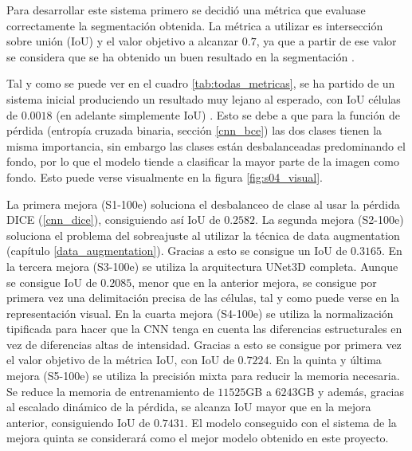 
Para desarrollar este sistema primero se decidió una métrica que evaluase correctamente la segmentación obtenida. La métrica a utilizar es intersección sobre unión (IoU) y el valor objetivo a alcanzar $0.7$, ya que a partir de ese valor se considera que se ha obtenido un buen resultado en la segmentación \cite{Falk2019}.

Tal y como se puede ver en el cuadro \ref{tab:todas_metricas}, se ha partido de un sistema inicial produciendo un resultado muy lejano al esperado, con IoU células de $0.0018$ (en adelante simplemente IoU) . Esto se debe a que para la función de pérdida (entropía cruzada binaria, sección \ref{cnn_bce}) las dos clases tienen la misma importancia, sin embargo las clases están desbalanceadas predominando el fondo, por lo que el modelo tiende a clasificar la mayor parte de la imagen como fondo. Esto puede verse visualmente en la figura \ref{fig:s04_visual}.

La primera mejora (S1-100e) soluciona el desbalanceo de clase al usar la pérdida DICE (\ref{cnn_dice}), consiguiendo así IoU de $0.2582$. La segunda mejora (S2-100e) soluciona el problema del sobreajuste  al utilizar la técnica de data augmentation (capítulo \ref{data_augmentation}). Gracias a esto se consigue un IoU de $0.3165$. En la tercera mejora (S3-100e) se utiliza la arquitectura UNet3D completa. Aunque se consigue IoU de $0.2085$, menor que en la anterior mejora, se consigue por primera vez una delimitación precisa de las células, tal y como puede verse en la representación visual. En la cuarta mejora (S4-100e) se utiliza la normalización tipificada para hacer que la CNN tenga en cuenta las diferencias estructurales en vez de diferencias altas de intensidad. Gracias a esto se consigue por primera vez el valor objetivo de la métrica IoU, con IoU de $0.7224$. En la quinta y última mejora (S5-100e) se utiliza la precisión mixta para reducir la memoria necesaria. Se reduce la memoria de entrenamiento de $11525$GB a $6243$GB y además, gracias al escalado dinámico de la pérdida, se alcanza IoU mayor que en la mejora anterior, consiguiendo IoU de $0.7431$. El modelo conseguido con el sistema de la mejora quinta se considerará como el mejor modelo obtenido en este proyecto. 

